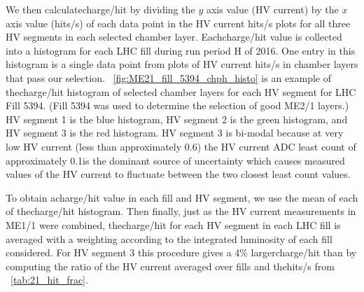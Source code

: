 We then calculate\unit{charge/hit} by dividing the $y$ axis value (HV current) by the $x$ axis value (hits$/$s) of each data point in the HV current \vs\unit{hits/s} plots for all three HV segments in each selected chamber layer. Each\unit{charge/hit} value is collected into a histogram for each LHC fill during run period H of 2016. One entry in this histogram is a single data point from plots of HV current \vs\unit{hits/s} in chamber layers that pass our selection. \Fig~\ref{fig:ME21_fill_5394_chph_histo} is an example of the\unit{charge/hit} histogram of selected chamber layers for each HV segment for LHC Fill 5394. (Fill 5394 was used to determine the selection of good ME2/1 layers.) HV segment 1 is the blue histogram, HV segment 2 is the green histogram, and HV segment 3 is the red histogram. HV segment 3 is bi-modal because at very low HV current (less than approximately 0.6\muA) the HV current ADC least count of approximately 0.1\muA is the dominant source of uncertainty which causes measured values of the HV current to fluctuate between the two closest least count values.

To obtain a\unit{charge/hit} value in each fill and HV segment, we use the mean of each of the\unit{charge/hit} histogram. Then finally, just as the HV current measurements in ME1/1 were combined, the\unit{charge/hit} for each HV segment in each LHC fill is averaged with a weighting according to the integrated luminosity of each fill considered. For HV segment 3 this procedure gives a 4\% larger\unit{charge/hit} than by computing the ratio of the HV current averaged over fills and the\unit{hits/s} from \Tab~\ref{tab:21_hit_frac}.

